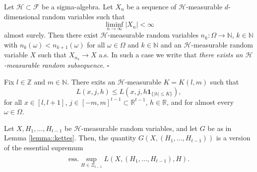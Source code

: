 \documentclass[10pt,a4paper]{amsart}
\newcommand{\indicator}[1]{\mathbf{1}_{\{ #1 \}}}
\begin{document}
\begin{lemma}\label{randomsub} Let $\mathcal{H}\subset\mathcal{F}$ be a sigma-algebra. 
Let $X_n$ be a sequence of $\mathcal{H}$-measurable $d$-dimensional random variables such that
\begin{equation}\label{raffaello}
\liminf_{n\to\infty}|X_n|<\infty
\end{equation}
almost surely. Then there exist
$\mathcal{H}$-measurable random variables 
$n_k:\Omega\to\mathbb{N}$, $k\in\mathbb{N}$ with $n_k(\omega)<n_{k+1}(\omega)$ for all $\omega\in\Omega$
and $k\in\mathbb{N}$ and an $\mathcal{H}$-measurable 
random variable $X$ such that $X_{n_k}\to X$ a.s. In such a case we write that 
\emph{there exists an $\mathcal{H}$-measurable
random subsequence}. \hfill $\square$
\end{lemma}

\begin{lemma}\label{lemma::kettes}
Fix $l \in \mathbb{Z}$ and $m \in \mathbb{N}$. There exits an $\mathcal{H}$-measurable $K = K(l,m)$ such that 
\begin{equation}\label{majus6}
L(x,j, h) \leq L(x, j, h \indicator{|h|\leq K}),
\end{equation}
for all $x \in [l,l+1]$, $j \in [-m,m]^{t-1} \subset \mathbb{R}^{t-1}$, $h \in \mathbb{R}$, and for almost every $\omega \in \Omega$.
\end{lemma}

\begin{lemma}\label{lemma::harmas}
Let $X,H_1,\hdots, H_{t-1} $ be $\mathcal{H}$-measurable random variables, and let $G$ be as in Lemma \ref{lemma::kettes}. Then, the quantity $G(X,(H_1,\hdots, H_{t-1}))$ is a version of the essential supremum
\begin{align*}
\begin{split}
\mathrm{ess.}\sup_{H\in \Xi_{t-1}}
L(X,(H_1,\hdots,H_{t-1}), H).
\end{split}
\end{align*}
\end{lemma}
\end{document}

